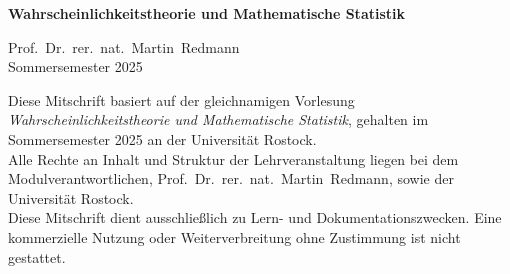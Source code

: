 \documentclass{article}
\begin{document}
\begin{titlepage}
    \centering
    \vspace*{3cm}
    \Large\textbf{Wahrscheinlichkeitstheorie und Mathematische Statistik}

    \vspace{1cm}
    \large
    Prof.\ Dr.\ rer.\ nat.\ Martin\ Redmann\\
    Sommersemester 2025

    \vfill
\end{titlepage}

\tableofcontents
\markboth{}{}
\newpage
\vspace*{2cm}
\begin{center}
    \begin{minipage}{0.85\textwidth}
        \small
        Diese Mitschrift basiert auf der gleichnamigen Vorlesung \textit{Wahrscheinlichkeitstheorie und 
        Mathematische Statistik}, gehalten im Sommersemester 2025 
        an der Universität Rostock.\\[0.5em]
        Alle Rechte an Inhalt und Struktur der Lehrveranstaltung liegen bei dem Modulverantwortlichen, 
        Prof.\ Dr.\ rer.\ nat.\ Martin\ Redmann, sowie der Universität Rostock.\\[0.5em]
        Diese Mitschrift dient ausschließlich zu Lern- und Dokumentationszwecken. Eine kommerzielle Nutzung oder 
        Weiterverbreitung ohne Zustimmung ist nicht gestattet.
    \end{minipage}
\end{center}









\end{document}
